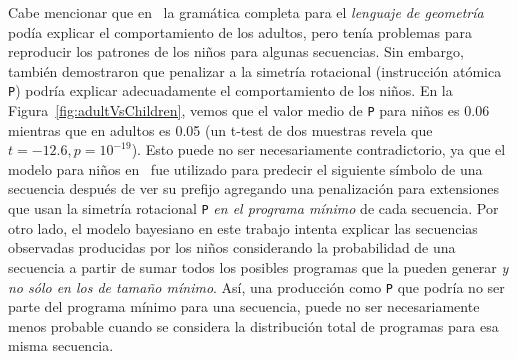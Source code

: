 
Cabe mencionar que en~\cite{amalric2017language} la gramática completa para el \textit{lenguaje de geometría} podía explicar el comportamiento de los adultos, pero tenía problemas para reproducir los patrones de los niños para algunas secuencias. Sin embargo, también demostraron que penalizar a la simetría rotacional (instrucción atómica \verb#P#)  podría explicar adecuadamente el comportamiento de los niños. En la Figura~\ref{fig:adultVsChildren}, vemos que el valor medio de \verb#P# para niños es 0.06 mientras que en adultos es 0.05 (un t-test de dos muestras revela que $t = -12.6, p = 10^{-19}$).  Esto puede no ser necesariamente contradictorio, ya que el modelo para niños en~\cite{amalric2017language} fue utilizado para predecir el siguiente símbolo de una secuencia después de ver su prefijo agregando una penalización para extensiones que usan la simetría rotacional \verb#P# \textit{en el programa mínimo} de cada secuencia. Por otro lado, el modelo bayesiano en este trabajo intenta explicar las secuencias observadas producidas por los niños considerando la probabilidad de una secuencia a partir de sumar todos los posibles programas que la pueden generar \textit{y no sólo en los de tamaño mínimo}. Así, una producción como \verb#P# que podría no ser parte del programa mínimo para una secuencia, puede no ser necesariamente menos probable cuando se considera la distribución total de programas para esa misma secuencia.

